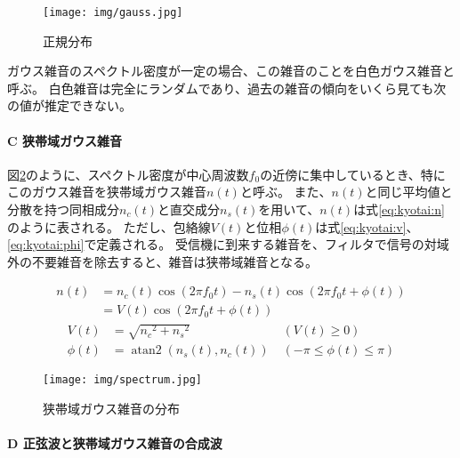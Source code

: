 \documentclass[twocolumn, dvipdfmx, 9pt]{jsarticle}
\begin{document}
 \begin{figure}[h]
    \centering
  \texttt{[image: img/gauss.jpg]}
    
    \caption{正規分布}
    \label{fig:gauss}
    \end{figure}

ガウス雑音のスペクトル密度が一定の場合、この雑音のことを白色ガウス雑音と呼ぶ。
白色雑音は完全にランダムであり、過去の雑音の傾向をいくら見ても次の値が推定できない。

\paragraph*{C 狭帯域ガウス雑音}\par
図\ref{fig:mitsudo}のように、スペクトル密度が中心周波数$f_0$の近傍に集中しているとき、特にこのガウス雑音を狭帯域ガウス雑音$n(t)$と呼ぶ。
また、$n(t)$と同じ平均値と分散を持つ同相成分$n_c(t)$と直交成分$n_s(t)$を用いて、$n(t)$は式\eqref{eq:kyotai:n}のように表される。
ただし、包絡線$V(t)$と位相$\phi (t)$は式\eqref{eq:kyotai:v}、\eqref{eq:kyotai:phi}で定義される。
受信機に到来する雑音を、フィルタで信号の対域外の不要雑音を除去すると、雑音は狭帯域雑音となる。

\begin{equation}
    \begin{aligned}\label{eq:kyotai:n}
      n(t) &= n_c(t) \operatorname{cos} \left( 2 \pi f_0 t \right) - n_s (t) \operatorname{cos} \left( 2 \pi f_0 t + \phi (t) \right) \\
      &= V(t) \operatorname{cos} \left( 2\pi f_0 t + \phi (t)  \right)
    \end{aligned}
 \end{equation}
 \begin{align}\label{eq:kyotai:v}
  V(t) &= \sqrt{{n_c}^2 + {n_s}^2 } \; &( V(t) \ge 0) \\
  \label{eq:kyotai:phi} \phi (t) &= \operatorname{atan2}({n_s(t)},{n_c(t)}) \; &( -\pi \le \phi (t) \le \pi )
  \end{align}

  \begin{figure}[h]
    \centering
  \texttt{[image: img/spectrum.jpg]}
    
    \caption{狭帯域ガウス雑音の分布}
    \label{fig:mitsudo}
    \end{figure}

\paragraph*{D 正弦波と狭帯域ガウス雑音の合成波}\par
\end{document}
